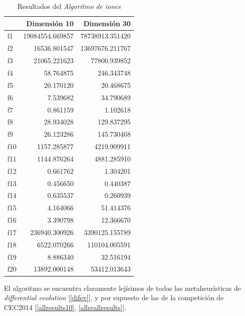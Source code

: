 \documentclass[a4paper,11pt]{article}
\begin{document}
 
  \begin{table}[H]	
  \caption{Resultados del \textit{Algoritmo de iones}}
  \centering
  \begin{tabular}{|l|r|r|}
  \hline
  &  \textbf{Dimensión 10}& \textbf{Dimensión 30} \\ \hline
  f1 &  19084554.669857 &  78738913.351420 \\ \hline
  f2 &  16536.801547 &  13697676.211767 \\ \hline
  f3 &  21065.221623 &  77800.939852 \\ \hline
  f4 &  58.764875 &  246.343748 \\ \hline
  f5 &  20.170120 &  20.468675 \\ \hline
  f6 &  7.539682 &  34.790689 \\ \hline
  f7 &  0.861159 &  1.102618 \\ \hline
  f8 &  28.934028 &  129.837295 \\ \hline
  f9 &  26.123286 &  145.730468 \\ \hline
  f10 &  1157.285877 &  4219.909911 \\ \hline
  f11 &  1144.876264 &  4881.285910 \\ \hline
  f12 &  0.661762 &  1.304201 \\ \hline
  f13 &  0.456650 &  0.440387 \\ \hline
  f14 &  0.635537 &  0.260939 \\ \hline
  f15 &  4.164066 &  51.414376 \\ \hline
  f16 &  3.390798 &  12.366670 \\ \hline
  f17 &  236940.300926 &  3390125.155789 \\ \hline
  f18 &  6522.070266 &  110104.005591 \\ \hline
  f19 &  8.886340 &  32.516194 \\ \hline
  f20 &  13892.000148 &  53412.013643 \\ \hline
  \end{tabular}  
  \label{ion-results}
  \end{table}

  El algoritmo se encuentra claramente lejísimos de todas las metaheurísticas de \textit{differential evolution} [\ref{difev}], y
  por supuesto de las de la competición de CEC2014 [\ref{allresults10}, \ref{allreallresults}].
\end{document}
